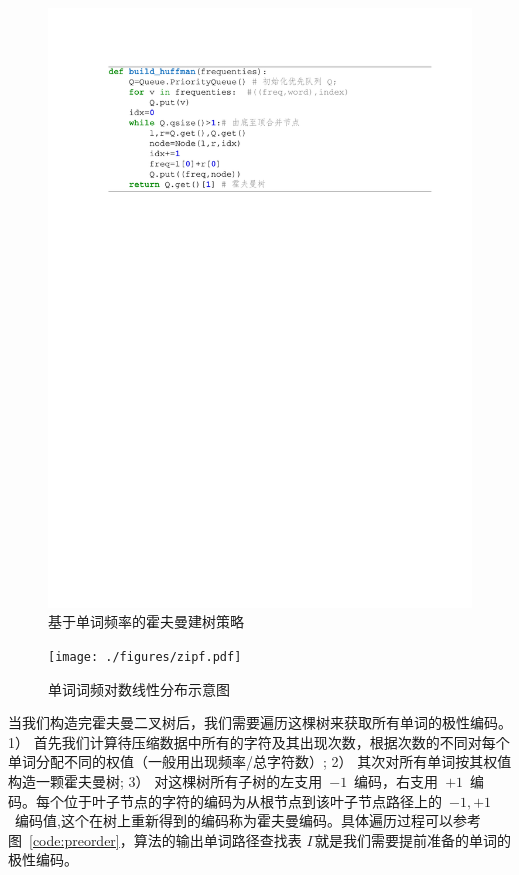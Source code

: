 \begin{figure}[!ht]
  \centering
\includegraphics[width=1\linewidth]{./figures/huffman.pdf}
\caption{基于单词频率的霍夫曼建树策略}\label{code:huffman}
\end{figure}

\begin{figure}[!ht]
  \centering
\texttt{[image: ./figures/zipf.pdf]}
\caption{单词词频对数线性分布示意图}\label{fig:zipf}
\end{figure}

当我们构造完霍夫曼二叉树后，我们需要遍历这棵树来获取所有单词的极性编码。1） 首先我们计算待压缩数据中所有的字符及其出现次数，根据次数的不同对每个单词分配不同的权值（一般用出现频率/总字符数）; 2） 其次对所有单词按其权值构造一颗霍夫曼树; 3） 对这棵树所有子树的左支用~$-1$~编码，右支用~$+1$~编码。每个位于叶子节点的字符的编码为从根节点到该叶子节点路径上的~$-1,+1$~编码值,这个在树上重新得到的编码称为霍夫曼编码。具体遍历过程可以参考图~\ref{code:preorder}，算法的输出单词路径查找表 $\Gamma$就是我们需要提前准备的单词的极性编码。


